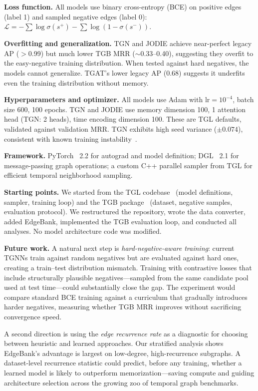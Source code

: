 \documentclass[10pt,twocolumn]{article}
\begin{document}
\textbf{Loss function.}
All models use binary cross-entropy (BCE) on positive edges (label 1) and sampled negative edges (label 0): $\mathcal{L} = -\sum \log\sigma(s^+) - \sum \log(1-\sigma(s^-))$.

\textbf{Overfitting and generalization.}
TGN and JODIE achieve near-perfect legacy AP ($>$0.99) but much lower TGB MRR ($\sim$0.33--0.40), suggesting they overfit to the easy-negative training distribution.
When tested against hard negatives, the models cannot generalize.
TGAT's lower legacy AP (0.68) suggests it underfits even the training distribution without memory.

\textbf{Hyperparameters and optimizer.}
All models use Adam with $\text{lr}=10^{-4}$, batch size 600, 100 epochs.
TGN and JODIE use memory dimension 100, 1 attention head (TGN: 2 heads), time encoding dimension 100.
These are TGL defaults, validated against validation MRR.
TGN exhibits high seed variance ($\pm 0.074$), consistent with known training instability~\cite{huang2024tgb}.

\textbf{Framework.}
PyTorch~\cite{pytorch} 2.2 for autograd and model definition; DGL~\cite{dgl} 2.1 for message-passing graph operations; a custom C++ parallel sampler from TGL for efficient temporal neighborhood sampling.

\textbf{Starting points.}
We started from the TGL codebase~\cite{zhou2022tgl} (model definitions, sampler, training loop) and the TGB package~\cite{huang2024tgb} (dataset, negative samples, evaluation protocol).
We restructured the repository, wrote the data converter, added EdgeBank, implemented the TGB evaluation loop, and conducted all analyses.
No model architecture code was modified.

\textbf{Future work.}
A natural next step is \emph{hard-negative-aware training}: current TGNNs train against random negatives but are evaluated against hard ones, creating a train--test distribution mismatch.
Training with contrastive losses that include structurally plausible negatives---sampled from the same candidate pool used at test time---could substantially close the gap.
The experiment would compare standard BCE training against a curriculum that gradually introduces harder negatives, measuring whether TGB MRR improves without sacrificing convergence speed.

A second direction is using the \emph{edge recurrence rate} as a diagnostic for choosing between heuristic and learned approaches.
Our stratified analysis shows EdgeBank's advantage is largest on low-degree, high-recurrence subgraphs.
A dataset-level recurrence statistic could predict, before any training, whether a learned model is likely to outperform memorization---saving compute and guiding architecture selection across the growing zoo of temporal graph benchmarks.
\end{document}
